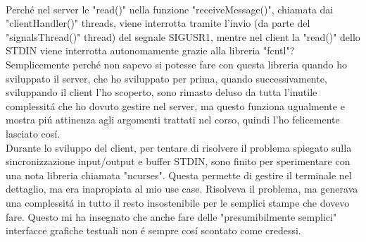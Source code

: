 \\
 Perch\'e nel server le "read()" nella funzione "receiveMessage()", chiamata dai "clientHandler()" threads, viene interrotta tramite l'invio (da parte del "signalsThread()" thread) del segnale SIGUSR1, mentre nel client la "read()" dello STDIN viene interrotta autonomamente grazie alla libreria "fcntl"? Semplicemente perch\'e non sapevo si potesse fare con questa libreria quando ho sviluppato il server, che ho sviluppato per prima, quando successivamente, sviluppando il client l'ho scoperto, sono rimasto deluso da tutta l'inutile complessit\'a che ho dovuto gestire nel server, ma questo funziona ugualmente e mostra pi\'u attinenza agli argomenti trattati nel corso, quindi l'ho felicemente lasciato cos\'i.
 \\
 Durante lo sviluppo del client, per tentare di risolvere il problema spiegato sulla sincronizzazione input/output e buffer STDIN, sono finito per sperimentare con una nota libreria chiamata "ncurses". Questa permette di gestire il terminale nel dettaglio, ma era inapropiata al mio use case. Risolveva il problema, ma generava una complessit\'a in tutto il resto insostenibile per le semplici stampe che dovevo fare. Questo mi ha insegnato che anche fare delle "presumibilmente semplici" interfacce grafiche testuali non \'e sempre cos\'i scontato come credessi.

 
\iffalse
\begin{figure}[H]
    \centering
    \texttt{[image: immagine.png]}
    \caption{Descrizione.}
\end{figure}
\fi

